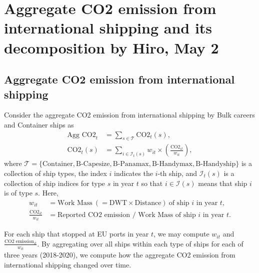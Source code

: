 \documentclass[11pt]{article}
\begin{document}



\section{Aggregate CO2 emission from international shipping and its decomposition by Hiro, May 2}

\subsection{Aggregate CO2 emission from international shipping}
 
Consider the aggregate CO2 emission from international shipping  by Bulk careers and Container ships as
\begin{align}
\text{Agg CO2}_{t} &= \sum_{s \in \mathcal{T}} \text{CO2}_{t}(s),\\
\text{CO2}_{t}(s) &= \sum_{i\in \mathcal{I}_t(s) } w_{it} \times \left(\frac{\text{CO2}_{it}}{w_{it}}\right),
\end{align}
where $\mathcal{T} =\{\text{Container}, \text{B-Capesize}, \text{B-Panamax}, \text{B-Handymax}, \text{B-Handyship}\}$ is a collection of ship types, the index $i$ indicates the $i$-th ship, and $\mathcal{I}_t(s)$ is a collection of ship indices for type $s$ in year $t$ so that $i\in \mathcal{I}(s)$ means that  ship $i$  is of type $s$. Here,
\begin{align*}
w_{it} & = \text{Work Mass}\ (= \text{DWT} \times \text{Distance}) \ \text{of ship $i$ in year $t$}, \\
\frac{\text{CO2}_{it}}{w_{it}}& = \text{Reported CO2 emission / Work Mass of ship $i$ in year $t$}.
\end{align*}

For each ship that stopped at EU ports in year $t$, we may compute $w_{it}$ and $\frac{\text{CO2 emission}_{it}}{w_{it}}$. By aggregating over all ships within each type of ships for each of three years (2018-2020), we compute how the aggregate CO2 emission from international shipping changed over time. 
\end{document}
